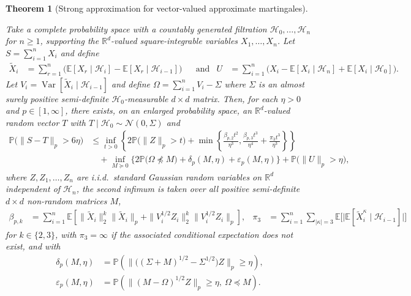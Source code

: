 \documentclass[11pt,lof]{puthesis}
\renewcommand{\P}{\ensuremath{\mathbb{P}}}
\newcommand{\R}{\ensuremath{\mathbb{R}}}
\newcommand{\E}{\ensuremath{\mathbb{E}}}
\newcommand{\cH}{\ensuremath{\mathcal{H}}}
\newcommand{\cN}{\ensuremath{\mathcal{N}}}
\DeclareMathOperator{\Var}{Var}
\theoremstyle{break}
\newtheorem{theorem}{Theorem}[section]
\theoremstyle{proof}
\begin{document}
\begin{theorem}[Strong approximation for vector-valued approximate martingales]
  \label{thm:yurinskii_sa_dependent}

  Take a complete probability space with a countably generated filtration
  $\cH_0, \ldots, \cH_n$ for $n \geq 1$, supporting the $\R^d$-valued
  square-integrable variables $X_1, \ldots, X_n$.
  Let $S = \sum_{i=1}^n X_i$ and define
  \begin{align*}
    \tilde X_i
    &= \sum_{r=1}^n \big(\E[X_{r} \mid \cH_{i}] - \E[X_{r} \mid \cH_{i-1}]\big)
    & &\text{and}
    &U &= \sum_{i=1}^{n} \big( X_i - \E[ X_i \mid \cH_n]
    + \E[ X_i \mid \cH_0 ] \big).
  \end{align*}
  Let $V_i = \Var[\tilde X_i \mid \cH_{i-1}]$ and
  define $\Omega = \sum_{i=1}^n V_i - \Sigma$
  where $\Sigma$ is an almost surely positive semi-definite $\cH_0$-measurable
  $d \times d$ matrix. Then, for each $\eta > 0$ and $p \in [1,\infty]$,
  there exists, on an enlarged probability space, an $\R^d$-valued random
  vector $T$ with $T \mid \cH_0 \sim \cN(0, \Sigma)$ and
  \begin{align}
    \label{eq:yurinskii_sa_dependent}
    \P\big(\|S-T\|_p > 6\eta\big)
    &\leq
    \inf_{t>0}
    \left\{
      2 \P\big( \|Z\|_p > t \big)
      + \min\left\{
        \frac{\beta_{p,2} t^2}{\eta^3},
        \frac{\beta_{p,3} t^3}{\eta^4}
        + \frac{\pi_3 t^3}{\eta^3}
      \right\}
    \right\} \nonumber \\
    &\quad+
    \inf_{M \succeq 0}
    \Big\{ 2 \P\big(\Omega \npreceq M\big) + \delta_p(M,\eta)
    + \varepsilon_p(M, \eta)\Big\}
    +\P\big(\|U\|_p>\eta\big),
  \end{align}
  where $Z, Z_1,\dots ,Z_n$ are i.i.d.\ standard Gaussian random variables on
  $\R^d$ independent of $\cH_n$, the second infimum is taken over all positive
  semi-definite $d \times d$ non-random matrices $M$,
  \begin{align*}
    \beta_{p,k}
    &=
    \sum_{i=1}^n \E\left[\| \tilde X_i \|^k_2 \| \tilde X_i \|_p
    + \|V_i^{1/2} Z_i \|^k_2 \|V_i^{1/2} Z_i \|_p \right],
    &\pi_3
    &=
    \sum_{i=1}^{n}
    \sum_{|\kappa| = 3}
    \E \Big[ \big|
      \E [ \tilde X_i^\kappa \mid \cH_{i-1} ]
    \big| \Big]
  \end{align*}
  for $k \in \{2, 3\}$, with $\pi_3 = \infty$ if the associated
  conditional expectation does not exist, and with
  \begin{align*}
    \delta_p(M,\eta)
    &=
    \P\left(
      \big\|\big((\Sigma +M)^{1/2}- \Sigma^{1/2}\big) Z\big\|_p
      \geq \eta
    \right), \\
    \varepsilon_p(M, \eta)
    &=
    \P\left(\big\| (M - \Omega)^{1/2} Z \big\|_p\geq \eta, \
    \Omega \preceq M\right).
  \end{align*}
\end{theorem}
\end{document}
